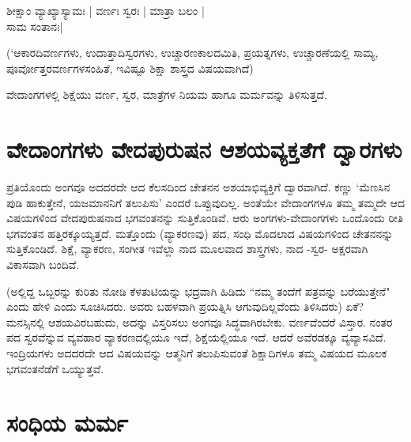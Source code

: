\begin{shloka}
ಶೀಕ್ಷಾಂ ವ್ಯಾಖ್ಯಾಸ್ಯಾಮಃ | ವರ್ಣಃ ಸ್ವರಃ | ಮಾತ್ರಾ ಬಲಂ |\\
ಸಾಮ ಸಂತಾನಃ|
\end{shloka}

(`ಆಕಾರದಿವರ್ಣಗಳು, ಉದಾತ್ತಾದಿಸ್ವರಗಳು, ಉಚ್ಚಾರಣಕಾಲದಮಿತಿ, ಪ್ರಯತ್ನಗಳು, ಉಚ್ಚಾರಣೆಯಲ್ಲಿ ಸಾಮ್ಯ, ಪೂರ್ವೋತ್ತರವರ್ಣಗಳಸಂಹಿತೆ, ಇವಿಷ್ಟೂ ಶಿಕ್ಷಾ ಶಾಸ್ತ್ರದ ವಿಷಯವಾಗಿದೆ)

ವೇದಾಂಗಗಳಲ್ಲಿ ಶಿಕ್ಷೆಯು ವರ್ಣ, ಸ್ವರ, ಮಾತ್ರೆಗಳ ನಿಯಮ ಹಾಗೂ ಮರ್ಮವನ್ನು ತಿಳಿಸುತ್ತದೆ.

\section*{ವೇದಾಂಗಗಳು ವೇದಪುರುಷನ ಆಶಯವ್ಯಕ್ತತೆಗೆ ದ್ವಾರಗಳು}

ಪ್ರತಿಯೊಂದು ಅಂಗವೂ ಅದದರದೇ ಆದ ಕೆಲಸದಿಂದ ಚೇತನನ ಅಶಯಾಭಿವ್ಯಕ್ತಿಗೆ ದ್ವಾರವಾಗಿದೆ. ಕಣ್ಣು `ಮೆಣಸಿನ ಪುಡಿ ಹಾಕುತ್ತೇನೆ, ಯಜಮಾನನಿಗೆ ತಲುಪಿಸು' ಎಂದರೆ ಒಪ್ಪುವುದಿಲ್ಲ. ಅಂತೆಯೇ ವೇದಾಂಗಗಳೂ ತಮ್ಮ ತಮ್ಮದೇ ಆದ ವಿಷಯಗಳಿಂದ ವೇದಪುರುಷನಾದ ಭಗವಂತನನ್ನು ಸುತ್ತಿಕೊಂಡಿವೆ. ಆರು ಅಂಗಗಳು-ವೇದಾಂಗಗಳು ಒಂದೊಂದು ರೀತಿ ಭಗವಂತನ ಹತ್ತಿರಕ್ಕೂಯ್ಯತ್ತದೆ. ಮತ್ತೊಂದು (ವ್ಯಾಕರಣವು) ಪದ, ಸಂಧಿ ಮೊದಲಾದ ವಿಷಯಗಳಿಂದ ಚೇತನನನ್ನು ಸುತ್ತಿಕೊಂಡಿದೆ. ಶಿಕ್ಷೆ, ವ್ಯಾಕರಣ, ಸಂಗೀತ ಇವೆಲ್ಲಾ ನಾದ ಮೂಲವಾದ ಶಾಸ್ತ್ರಗಳು, ನಾದ -ಸ್ವರ- ಅಕ್ಷರವಾಗಿ ವಿಕಾಸವಾಗಿ ಬಂದಿವೆ. 

(ಅಲ್ಲಿದ್ದ ಒಬ್ಬರನ್ನು ಕುರಿತು ನೋಡಿ ಕೆಳತುಟಿಯನ್ನು ಭದ್ರವಾಗಿ ಹಿಡಿದು ``ನಮ್ಮ ತಂದೆಗೆ ಪತ್ರವನ್ನು ಬರೆಯುತ್ತೇನೆ" ಎಂದು ಹೇಳಿ ಎಂದು ಸೂಚಿಸಿದರು. ಅವರು ಬಹಳವಾಗಿ ಪ್ರಯತ್ನಿಸಿ ಆಗುವುದಿಲ್ಲವೆಂದು ತಿಳಿಸಿದರು) ಏಕೆ? ಮನಸ್ಸಿನಲ್ಲಿ ಆಶಯವಿರಬಹುದು, ಅದನ್ನು ವಿಸ್ತರಿಸಲು ಅಂಗವೂ ಸಿದ್ಧವಾಗಿರಬೇಕು. ವರ್ಣವೆಂದರೆ ವಿಸ್ತಾರ. ನಂತರ ಪದ ಸ್ವರವೆನ್ನುವ ವ್ಯವಹಾರ ವ್ಯಾಕರಣದಲ್ಲಿಯೂ ಇದೆ, ಶಿಕ್ಷೆಯಲ್ಲಿಯೂ ಇದೆ. ಆದರೆ ಅವೆರಡಕ್ಕೂ ವ್ಯವ್ಯಾಸವಿದೆ. ಇಂದ್ರಿಯಗಳು ಅದದರದೇ ಆದ ವಿಷಯವನ್ನು ಆತ್ಮನಿಗೆ ತಲುಪಿಸುವಂತೆ ಶಿಕ್ಷಾದಿಗಳೂ ತಮ್ಮ ವಿಷಯದ ಮೂಲಕ ಭಗವಂತನೆಡೆಗೆ  ಒಯ್ಯುತ್ತವೆ.

\section*{ಸಂಧಿಯ ಮರ್ಮ}

